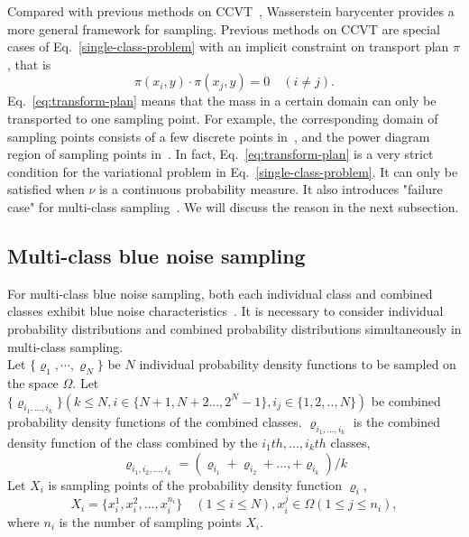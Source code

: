 Compared with previous methods on CCVT~\cite{balzer:2009:capacity,de:2012:blue},
Wasserstein barycenter provides a more general framework for sampling.
Previous methods on CCVT are special cases of Eq.~\ref{single-class-problem} with an implicit constraint on  transport plan $\pi$,
that is
\begin{equation}\label{eq:transform-plan}
  \pi(x_i,y)\cdot\pi(x_j,y)=0 \quad(i\neq j).
\end{equation}
Eq.~\ref{eq:transform-plan} means that the mass in a certain domain can only be transported to one sampling point.
For example,
the corresponding domain of sampling points consists of a few discrete points in~\cite{balzer:2009:capacity},
and the power diagram region of sampling points in~\cite{de:2012:blue}.
In fact,
Eq.~\ref{eq:transform-plan} is a very strict condition for the variational problem in Eq.~\ref{single-class-problem}.
It can only be satisfied when $\nu$ is a continuous probability measure.
It also introduces "failure case" for multi-class sampling~\cite{wei:2010:multi}.
We will discuss the reason in the next subsection.

\subsection{Multi-class blue noise sampling}
For multi-class blue noise sampling,
both each individual class and combined classes exhibit blue noise characteristics~\cite{wei:2010:multi}.
It is necessary to consider individual probability distributions and combined probability distributions simultaneously
in multi-class sampling. \\
Let $\{\varrho_1,\cdots,\varrho_N\}$ be $N$ individual probability density functions
to be sampled on the space $\Omega$.
Let $\{\varrho_{{i}_1,...,i_k}\}(k\leq N, i\in\{N+1,N+2...,2^N-1\},i_j\in\{1,2,..,N\})$
be combined probability density functions of the combined classes.
$\varrho_{{i}_1,...,i_k}$ is the combined density function of the class combined by  the $i_1th,...,i_kth$ classes,
\begin{equation*}
    \varrho_{i_1,i_2,...,i_k}=(\varrho_{i_1}+\varrho_{i_2}+...,+\varrho_{i_k})/k
\end{equation*}
Let $X_i$ is sampling points of the probability density function $\varrho_i$,
\begin{equation*}
  X_i=\{x_i^1,x_i^2,...,x_i^{n_i}\}\quad(1\leq i\leq N), x_i^j\in\Omega(1\leq j\leq n_i),
\end{equation*}
where $n_i$ is the number of sampling points $X_i$.

